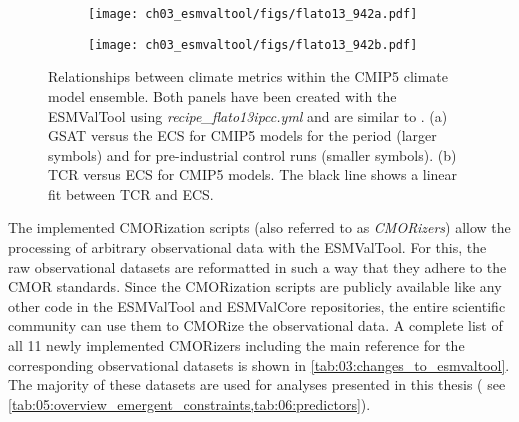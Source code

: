 \begin{figure}[t]
  \centering
  \begin{subfigure}[b]{0.36\columnwidth}
    \texttt{[image: ch03\_esmvaltool/figs/flato13\_942a.pdf]}
    \caption{}
    \label{fig:03:flato13:a}
  \end{subfigure}
  \begin{subfigure}[b]{0.36\columnwidth}
    \texttt{[image: ch03\_esmvaltool/figs/flato13\_942b.pdf]}
    \caption{}
    \label{fig:03:flato13:b}
  \end{subfigure}
  \begin{subfigure}[b]{0.26\columnwidth}
  \end{subfigure}
  \caption[
    Relationships between climate metrics within the \acs{CMIP}5 climate model
    ensemble.
  ]{
    Relationships between climate metrics within the \acs{CMIP}5 climate model
    ensemble. Both panels have been created with the \acs{ESMValTool} using
    \emph{recipe\_flato13ipcc.yml} and are similar to \textcite{Flato2013}. (a)
    \Acf{GSAT} versus the \acf{ECS} for \acs{CMIP}5 models for the period
     (larger symbols) and for pre-industrial control runs
    (smaller symbols). (b) \Acf{TCR} versus \acs{ECS} for \acs{CMIP}5 models.
    The black line shows a linear fit between \acs{TCR} and \acs{ECS}.
  }
  \label{fig:03:flato13}
\end{figure}

The implemented \acs{CMOR}ization scripts (also referred to as
\emph{\acs{CMOR}izers}) allow the processing of arbitrary observational data
with the \ac{ESMValTool}. For this, the raw observational datasets are
reformatted in such a way that they adhere to the \ac{CMOR} standards. Since
the \acs{CMOR}ization scripts are publicly available like any other code in the
\ac{ESMValTool} and \ac{ESMValCore} repositories, the entire scientific
community can use them to \acs{CMOR}ize the observational data. A complete list
of all 11 newly implemented \acs{CMOR}izers including the main reference for
the corresponding observational datasets is shown in
\cref{tab:03:changes_to_esmvaltool}. The majority of these datasets are used
for analyses presented in this thesis (\eg{} see
\cref{tab:05:overview_emergent_constraints,tab:06:predictors}).
